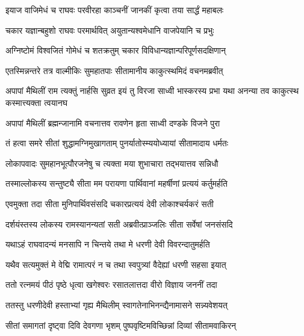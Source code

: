 \twolineshloka
{इयाज वाजिमेधं च राघवः परवीरहा}
{काञ्चनीं जानकीं कृत्वा तया सार्द्धं महाबलः}%

\twolineshloka
{चकार यज्ञान्बहुशो राघवः परमार्थवित्}
{अयुतान्यश्वमेधानि वाजपेयानि च प्रभुः}%

\twolineshloka
{अग्निष्टोमं विश्वजितं गोमेधं च शतक्रतुम्}
{चकार विविधान्यज्ञान्परिपूर्णसदक्षिणान्}%

\twolineshloka
{एतस्मिन्नन्तरे तत्र वाल्मीकिः सुमहातपाः}
{सीतामानीय काकुत्स्थमिदं वचनमब्रवीत्}%



\threelineshloka
{अपापां मैथिलीं राम त्यक्तुं नार्हसि सुव्रत}
{इयं तु विरजा साध्वी भास्करस्य प्रभा यथा}
{अनन्या तव काकुत्स्थ कस्मात्त्यक्ता त्वयानघ}%


\twolineshloka
{अपापां मैथिलीं ब्रह्मन्जानामि वचनात्तव}
{रावणेन हृता साध्वी दण्डके विजने पुरा}%

\twolineshloka
{तं हत्वा समरे सीतां शुद्धामग्निमुखागताम्}
{पुनर्यातोस्म्ययोध्यायां सीतामादाय धर्मतः}%

\twolineshloka
{लोकापवादः सुमहानभूत्पौरजनेषु च}
{त्यक्ता मया शुभाचारा तद्भयात्तव सन्निधौ}%

\twolineshloka
{तस्माल्लोकस्य सन्तुष्ट्यै सीता मम परायणा}
{पार्थिवानां महर्षीणां प्रत्ययं कर्तुमर्हति}%


\twolineshloka
{एवमुक्ता तदा सीता मुनिपार्थिवसंसदि}
{चकारप्रत्ययं देवी लोकाश्चर्यकरं सती}%

\twolineshloka
{दर्शयंस्तस्य लोकस्य रामस्यानन्यतां सती}
{अब्रवीत्प्राञ्जलिः सीता सर्वेषां जनसंसदि}%


\twolineshloka
{यथाऽहं राघवादन्यं मनसापि न चिन्तये}
{तथा मे धरणी देवी विवरन्दातुमर्हति}%

\twolineshloka
{यथैव सत्यमुक्तं मे वेद्मि रामात्परं न च}
{तथा स्वपुत्र्यां वैदेह्यां धरणी सहसा इयात्}%


\twolineshloka
{ततो रत्नमयं पीठं पृष्ठे धृत्वा खगेश्वरः}
{रसातलात्तदा वीरो विज्ञाय जननीं तदा}%

\twolineshloka
{ततस्तु धरणीदेवी हस्ताभ्यां गृह्य मैथिलीम्}
{स्वागतेनाभिनन्द्यैनामासने सन्न्यवेशयत्}%

\twolineshloka
{सीतां समागतां दृष्ट्वा दिवि देवगणा भृशम्}
{पुष्पवृष्टिमविच्छिन्नां दिव्यां सीतामवाकिरन्}%

